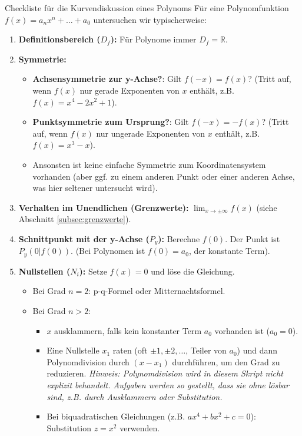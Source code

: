 \begin{merksatzumgebung}{Checkliste für die Kurvendiskussion eines Polynoms}
Für eine Polynomfunktion $f(x) = a_n x^n + \dots + a_0$ untersuchen wir typischerweise:
\begin{enumerate}
    \item \textbf{Definitionsbereich ($D_f$):} Für Polynome immer $D_f = \mathbb{R}$.
    \item \textbf{Symmetrie:}
        \begin{itemize}
            \item \textbf{Achsensymmetrie zur y-Achse?}: Gilt $f(-x) = f(x)$? (Tritt auf, wenn $f(x)$ nur gerade Exponenten von $x$ enthält, z.B. $f(x)=x^4-2x^2+1$).
            \item \textbf{Punktsymmetrie zum Ursprung?}: Gilt $f(-x) = -f(x)$? (Tritt auf, wenn $f(x)$ nur ungerade Exponenten von $x$ enthält, z.B. $f(x)=x^3-x$).
            \item Ansonsten ist keine einfache Symmetrie zum Koordinatensystem vorhanden (aber ggf. zu einem anderen Punkt oder einer anderen Achse, was hier seltener untersucht wird).
        \end{itemize}
    \item \textbf{Verhalten im Unendlichen (Grenzwerte):} $\lim_{x \to \pm \infty} f(x)$ (siehe Abschnitt \ref{subsec:grenzwerte}).
    \item \textbf{Schnittpunkt mit der y-Achse ($P_y$):} Berechne $f(0)$. Der Punkt ist $P_y(0|f(0))$. (Bei Polynomen ist $f(0)=a_0$, der konstante Term).
    \item \textbf{Nullstellen ($N_i$):} Setze $f(x)=0$ und löse die Gleichung.
        \begin{itemize}
            \item Bei Grad $n=2$: p-q-Formel oder Mitternachtsformel.
            \item Bei Grad $n>2$:
                \begin{itemize}
                    \item $x$ ausklammern, falls kein konstanter Term $a_0$ vorhanden ist ($a_0=0$).
                    \item Eine Nullstelle $x_1$ raten (oft $\pm 1, \pm 2, \dots$, Teiler von $a_0$) und dann Polynomdivision durch $(x-x_1)$ durchführen, um den Grad zu reduzieren. \textit{Hinweis: Polynomdivision wird in diesem Skript nicht explizit behandelt. Aufgaben werden so gestellt, dass sie ohne lösbar sind, z.B. durch Ausklammern oder Substitution.}
                    \item Bei biquadratischen Gleichungen (z.B. $ax^4+bx^2+c=0$): Substitution $z=x^2$ verwenden.

\end{itemize}
\end{itemize}
\end{enumerate}
\end{merksatzumgebung}
